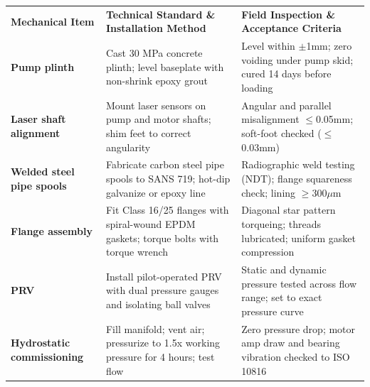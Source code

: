 {\fontsize{7.7pt}{9.8pt}\selectfont
\renewcommand{\arraystretch}{1.23}
\noindent
\begin{tabularx}{\textwidth}{@{}p{3.3cm} p{6.6cm} X@{}}
\rowcolor{mhnavy}
{\color{white}\bfseries Mechanical Item} & {\color{white}\bfseries Technical Standard \& Installation Method} & {\color{white}\bfseries Field Inspection \& Acceptance Criteria} \\
\rowcolor{mhbluelight}
\bfseries Pump plinth & Cast 30 MPa concrete plinth; level baseplate with non-shrink epoxy grout & Level within $\pm$1mm; zero voiding under pump skid; cured 14 days before loading \\
\bfseries Laser shaft alignment & Mount laser sensors on pump and motor shafts; shim feet to correct angularity & Angular and parallel misalignment $\le$0.05mm; soft-foot checked ($\le$0.03mm) \\
\rowcolor{mhbluelight}
\bfseries Welded steel pipe spools & Fabricate carbon steel pipe spools to SANS 719; hot-dip galvanize or epoxy line & Radiographic weld testing (NDT); flange squareness check; lining $\ge$300$\mu$m \\
\bfseries Flange assembly & Fit Class 16/25 flanges with spiral-wound EPDM gaskets; torque bolts with torque wrench & Diagonal star pattern torqueing; threads lubricated; uniform gasket compression \\
\rowcolor{mhbluelight}
\bfseries PRV & Install pilot-operated PRV with dual pressure gauges and isolating ball valves & Static and dynamic pressure tested across flow range; set to exact pressure curve \\
\bfseries Hydrostatic commissioning & Fill manifold; vent air; pressurize to 1.5x working pressure for 4 hours; test flow & Zero pressure drop; motor amp draw and bearing vibration checked to ISO 10816 \\
\end{tabularx}
\renewcommand{\arraystretch}{1}
}

\vfill

